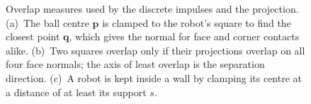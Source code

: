 \begin{figure}[htbp]
{}
    \caption{Overlap measures used by the discrete impulses and the projection.
    (a)~The ball centre $\mathbf p$ is clamped to the robot's square to find the closest
    point $\mathbf q$, which gives the normal for face and corner contacts alike.
    (b)~Two squares overlap only if their projections overlap on all four face normals;
    the axis of least overlap is the separation direction.  (c)~A robot is kept
    inside a wall by clamping its centre at a distance of at least its support $s$.}
    \label{fig:contact_geometry}
\end{figure}
